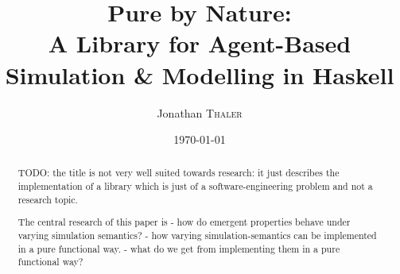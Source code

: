 \documentclass{article}
\title{Pure by Nature:\\A Library for Agent-Based Simulation \& Modelling in Haskell} %
\author{Jonathan \textsc{Thaler}} %
\date{\today} %
\begin{document}
\maketitle %

\begin{abstract}
TODO: the title is not very well suited towards research: it just describes the implementation of a library which is just of a software-engineering problem and not a research topic.

The central research of this paper is
- how do emergent properties behave under varying simulation semantics?
- how varying simulation-semantics can be implemented in a pure functional way.
- what do we get from implementing them in a pure functional way?


\end{abstract}
\end{document}

